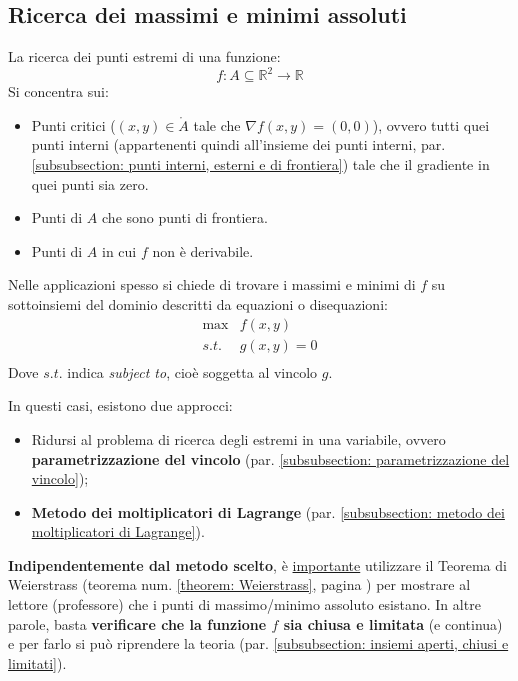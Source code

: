 \documentclass[a4paper]{article}
\newcommand{\definition}[1]{\textcolor{Red3}{\textbf{#1}}}
\begin{document}
	\subsection{Ricerca dei massimi e minimi assoluti}\label{subsection: ricerca dei massimi e minimi assoluti}

	La ricerca dei punti estremi di una funzione:
	\begin{equation*}
		f: A \subseteq \mathbb{R}^{2} \longrightarrow \mathbb{R}
	\end{equation*}
	Si concentra sui:
	\begin{itemize}
		\item Punti critici ($\left(x,y\right) \in \mathring{A}$ tale che $\nabla f\left(x,y\right) = \left(0,0\right)$), ovvero tutti quei punti interni (appartenenti quindi all'insieme dei punti interni, par. \ref{subsubsection: punti interni, esterni e di frontiera}) tale che il gradiente in quei punti sia zero.

		\item Punti di $A$ che sono punti di frontiera.

		\item Punti di $A$ in cui $f$ non è derivabile.
	\end{itemize}
	Nelle applicazioni spesso si chiede di trovare i massimi e minimi di $f$ su sottoinsiemi del dominio descritti da equazioni o disequazioni:
	\begin{equation*}
		\begin{array}{rl}
			\max & f\left(x,y\right) \\
			s.t. & g\left(x,y\right)=0 \\
		\end{array}
	\end{equation*}
	Dove $s.t.$ indica \emph{subject to}, cioè soggetta al vincolo $g$.\newline
	
	\noindent
	In questi casi, esistono due approcci:
	\begin{itemize}
		\item Ridursi al problema di ricerca degli estremi in una variabile, ovvero \definition{parametrizzazione del vincolo} (par. \ref{subsubsection: parametrizzazione del vincolo});

		\item \definition{Metodo dei moltiplicatori di Lagrange} (par. \ref{subsubsection: metodo dei moltiplicatori di Lagrange}).
	\end{itemize}
	\textbf{Indipendentemente dal metodo scelto}, è \underline{importante} utilizzare il Teorema di Weierstrass (teorema num. \ref{theorem: Weierstrass}, pagina \pageref{theorem: Weierstrass}) per mostrare al lettore (professore) che i punti di massimo/minimo assoluto esistano. In altre parole, basta \textbf{verificare che la funzione $f$ sia chiusa e limitata} (e continua) e per farlo si può riprendere la teoria (par. \ref{subsubsection: insiemi aperti, chiusi e limitati}).\newpage
\end{document}
